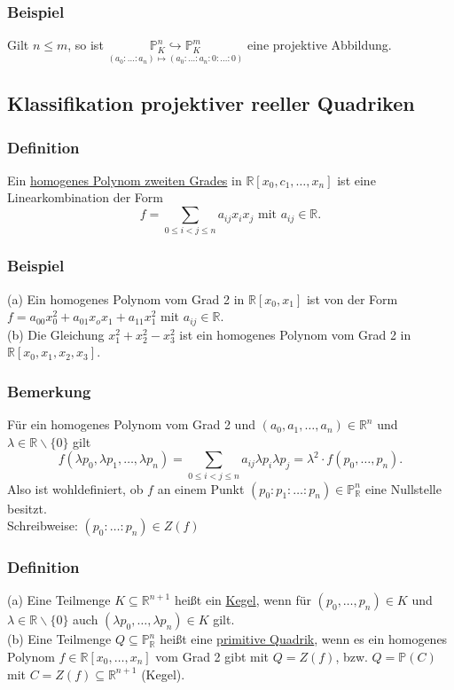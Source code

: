 \documentclass[a4paper]{article}
\newcommand{\ul}{\underline}
\begin{document}
\subsubsection{Beispiel}
Gilt \(n\leq m\), so ist \(\underset{(a_0:\dots:a_n)\mapsto(a_0:\dots:a_n:0:\dots:0)}{\mathbb{P}_K^n\hookrightarrow\mathbb{P}_K^m}\) eine projektive Abbildung.
\subsection{Klassifikation projektiver reeller Quadriken}
\subsubsection{Definition}
Ein \ul{homogenes Polynom zweiten Grades} in \(\mathbb{R}\left[x_0,c_1,\dots,x_n\right]\) ist eine Linearkombination der Form
$$f=\sum_{0\leq i<j\leq n}a_{ij}x_ix_j\text{ mit }a_{ij}\in\mathbb{R}.$$
\subsubsection{Beispiel}
(a) Ein homogenes Polynom vom Grad 2 in \(\mathbb{R}\left[x_0,x_1\right]\) ist von der Form \(f=a_{00}x_0^2+a_{01}x_ox_1+a_{11}x_1^2\) mit \(a_{ij}\in\mathbb{R}\).\\
(b) Die Gleichung \(x_1^2+x_2^2-x_3^2\) ist ein homogenes Polynom vom Grad 2 in \(\mathbb{R}\left[x_0,x_1,x_2,x_3\right]\).
\subsubsection{Bemerkung}
Für ein homogenes Polynom vom Grad 2 und \((a_0,a_1,\dots,a_n)\in\mathbb{R}^n\) und \(\lambda\in\mathbb{R}\backslash\{0\}\) gilt
$$f(\lambda p_0,\lambda p_1,\dots,\lambda p_n)=\sum_{0\leq i < j\leq n}a_{ij}\lambda p_i \lambda p_j=\lambda^2\cdot f(p_0,\dots,p_n).$$
Also ist wohldefiniert, ob \(f\) an einem Punkt \((p_0:p_1:\dots:p_n)\in\mathbb{P}_\mathbb{R}^n\) eine Nullstelle besitzt.\\
Schreibweise: \((p_0:\dots:p_n)\in Z(f)\)
\subsubsection{Definition}
(a) Eine Teilmenge \(K\subseteq \mathbb{R}^{n+1}\) heißt ein \ul{Kegel}, wenn für \((p_0,\dots,p_n)\in K\) und \(\lambda\in\mathbb{R}\backslash\{0\}\) auch \((\lambda p_0,\dots,\lambda p_n)\in K\) gilt.\\
(b) Eine Teilmenge \(Q\subseteq\mathbb{P}_\mathbb{R}^n\) heißt eine \ul{primitive Quadrik}, wenn es ein homogenes Polynom \(f\in\mathbb{R}\left[x_0,\dots,x_n\right]\) vom Grad 2 gibt mit \(Q=Z(f)\), bzw. \(Q=\mathbb{P}(C)\) mit \(C=Z(f)\subseteq\mathbb{R}^{n+1}\) (Kegel).
\end{document}
